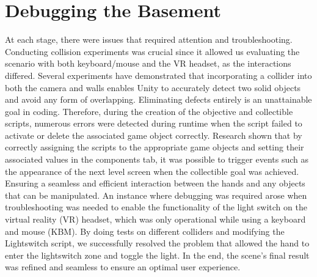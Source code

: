 \documentclass{vgtc}                          %
\begin{document}
\section{Debugging the Basement}
At each stage, there were issues that required attention and troubleshooting. Conducting collision experiments was crucial since it allowed us evaluating the scenario with both keyboard/mouse and the VR headset, as the interactions differed. Several experiments have demonstrated that incorporating a collider into both the camera and walls enables Unity to accurately detect two solid objects and avoid any form of overlapping. Eliminating defects entirely is an unattainable goal in coding. Therefore, during the creation of the objective and collectible scripts, numerous errors were detected during runtime when the script failed to activate or delete the associated game object correctly. Research shown that by correctly assigning the scripts to the appropriate game objects and setting their associated values in the components tab, it was possible to trigger events such as the appearance of the next level screen when the collectible goal was achieved. Ensuring a seamless and efficient interaction between the hands and any objects that can be manipulated. An instance where debugging was required arose when troubleshooting was needed to enable the functionality of the light switch on the virtual reality (VR) headset, which was only operational while using a keyboard and mouse (KBM). By doing tests on different colliders and modifying the Lightswitch script, we successfully resolved the problem that allowed the hand to enter the lightswitch zone and toggle the light. In the end, the scene's final result was refined and seamless to ensure an optimal user experience.
\end{document}
